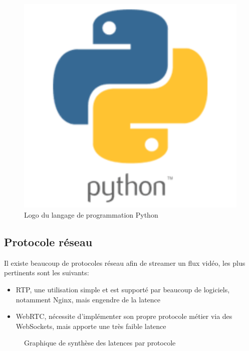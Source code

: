 \documentclass[12pt, a4paper]{report}
\begin{document}
\begin{figure}[H]
    \centering
    \includegraphics[width=.35\textwidth]{python.png}
    \caption{Logo du langage de programmation Python}
\end{figure}
\subsection{Protocole réseau}
Il existe beaucoup de protocoles réseau afin de streamer un flux vidéo, les plus pertinents sont les suivants:\newline
\begin{itemize}
    \item RTP, une utilisation simple et est supporté par beaucoup de logiciels, notamment Nginx, mais engendre de la latence\newline
    \item WebRTC, nécessite d'implémenter son propre protocole métier via des WebSockets, mais apporte une très faible latence\newline
\end{itemize}
\begin{figure}[H]
    \centering
    \caption{Graphique de synthèse des latences par protocole}
\end{figure}
\newpage
\end{document}
